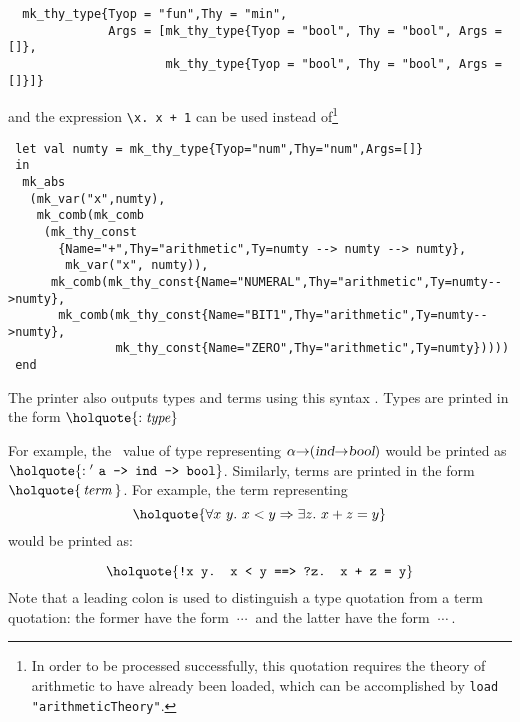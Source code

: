 \begin{hol}
\begin{verbatim}
  mk_thy_type{Tyop = "fun",Thy = "min",
              Args = [mk_thy_type{Tyop = "bool", Thy = "bool", Args = []}, 
                      mk_thy_type{Tyop = "bool", Thy = "bool", Args = []}]}
\end{verbatim}
\end{hol}

\noindent and the expression {\small\verb|\x. x + 1|}
%
%
can be used instead of\footnote{In order to be processed successfully, this
quotation requires the theory of arithmetic to have already been loaded, which 
can be accomplished by {\tt load "arithmeticTheory"}.}

{\small\baselineskip\HOLSpacing
\begin{verbatim}
 let val numty = mk_thy_type{Tyop="num",Thy="num",Args=[]}
 in 
  mk_abs
   (mk_var("x",numty),
    mk_comb(mk_comb
     (mk_thy_const
       {Name="+",Thy="arithmetic",Ty=numty --> numty --> numty},
        mk_var("x", numty)),
      mk_comb(mk_thy_const{Name="NUMERAL",Thy="arithmetic",Ty=numty-->numty},
       mk_comb(mk_thy_const{Name="BIT1",Thy="arithmetic",Ty=numty-->numty},
               mk_thy_const{Name="ZERO",Thy="arithmetic",Ty=numty}))))
 end
\end{verbatim}
}

 The \HOL{} printer also outputs types and terms using this syntax
.
Types are printed
in the form $\holquote{:\mathit{type}}$

For example, the \ML\ value of type  representing
$\alpha{\to}(\textsl{ind}{\to}\textsl{bool})$ would be printed
as $\holquote{: \ml{\ensuremath{{}^\prime\!} a -> ind -> bool}}$.
Similarly, terms are printed in the form $\holquote{\,\mathit{term}\,}$. 
For example, the term representing
%
\[ \holquote{\uquant{x\ y}x<y \imp\equant{z}x+z = y} \]
%
would be printed as:
%

\[ \holquote{\ml{!x y. x < y ==> ?z. x + z = y}} \]
%
Note that a leading colon
is used to distinguish a type quotation from a term quotation:
the former have the form $\ \cdots\ $ and the latter have
the form $\ \cdots\ $.

